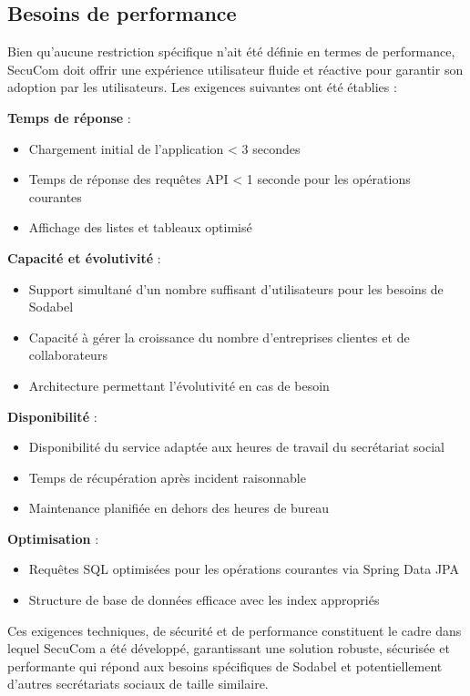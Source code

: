 \subsection{Besoins de performance}

Bien qu'aucune restriction spécifique n'ait été définie en termes de performance, SecuCom doit offrir une expérience utilisateur fluide et réactive pour garantir son adoption par les utilisateurs. Les exigences suivantes ont été établies :

\textbf{Temps de réponse} :
\begin{itemize}
  \item Chargement initial de l'application < 3 secondes
  \item Temps de réponse des requêtes API < 1 seconde pour les opérations courantes
  \item Affichage des listes et tableaux optimisé
\end{itemize}

\textbf{Capacité et évolutivité} :
\begin{itemize}
  \item Support simultané d'un nombre suffisant d'utilisateurs pour les besoins de Sodabel
  \item Capacité à gérer la croissance du nombre d'entreprises clientes et de collaborateurs
  \item Architecture permettant l'évolutivité en cas de besoin
\end{itemize}

\textbf{Disponibilité} :
\begin{itemize}
  \item Disponibilité du service adaptée aux heures de travail du secrétariat social
  \item Temps de récupération après incident raisonnable
  \item Maintenance planifiée en dehors des heures de bureau
\end{itemize}

\textbf{Optimisation} :
\begin{itemize}
  \item Requêtes SQL optimisées pour les opérations courantes via Spring Data JPA
  \item Structure de base de données efficace avec les index appropriés
\end{itemize}

Ces exigences techniques, de sécurité et de performance constituent le cadre dans lequel SecuCom a été développé, garantissant une solution robuste, sécurisée et performante qui répond aux besoins spécifiques de Sodabel et potentiellement d'autres secrétariats sociaux de taille similaire.
